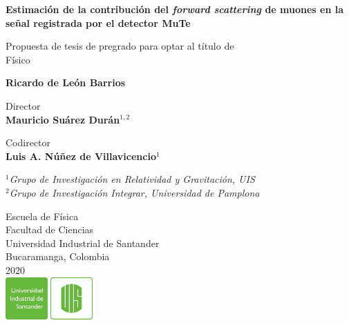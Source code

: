 \documentclass[12pt]{report}
\begin{document}
\begin{titlepage}
   \begin{center}
       \vspace*{1cm}
       
       
       \large
       \textbf{Estimación de la contribución del \textit{forward scattering} de muones en la señal registrada por el detector MuTe}
       
 
       \vspace{1.5cm}
 
       \small
       Propuesta de tesis de pregrado para optar al título de \\
       Físico
       
       
       \normalsize
       \textbf{Ricardo de León Barrios}
       
       \small
       \vspace{1cm}
       Director\\
       \textbf{Mauricio Suárez Durán}$^{1,2}$
       
       \vspace{1cm}
       Codirector\\
       \textbf{Luis A. Núñez de Villavicencio}$^1$
       
       \vspace{1cm}
       $^1$\textit{Grupo de Investigación en Relatividad y Gravitación, UIS}\\
       $^2$\textit{Grupo de Investigación Integrar, Universidad de Pamplona}
 
       \vfill
       
       
 
 
       
 
       \small
       Escuela de Física\\
       Facultad de Ciencias\\
       Universidad Industrial de Santander\\
       Bucaramanga, Colombia\\
       2020\\
       \vspace{0.3cm}
       \includegraphics[width=0.25\textwidth]{logo/logoUIS.png}
 
   \end{center}
\end{titlepage}
\end{document}
